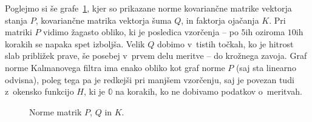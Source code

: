 \documentclass[a4paper,pdftex,10pt]{article}
\numberwithin{figure}{section} %
\begin{document}
Poglejmo si še grafe~\ref{slika11}, kjer so prikazane norme kovariančne matrike vektorja 
stanja $P$, kovariančne matrika vektorja šuma $Q$, in faktorja ojačanja $K$. Pri matriki
$P$ vidimo žagasto obliko, ki je posledica vzorčenja -- po $5$ih oziroma $10$ih korakih
se napaka spet izboljša. Velik $Q$ dobimo v~tistih točkah, ko je hitrost slab približek
prave, še posebej v~prvem delu meritve -- do krožnega zavoja. Graf norme Kalmanovega filtra
ima enako obliko kot graf norme $P$ (saj sta linearno odvisna), poleg tega pa je redkejši 
pri manjšem vzorčenju, saj je povezan tudi z~okensko funkcijo $H$, ki je $\mathbb{0}$ na
korakih, ko ne dobivamo podatkov o~meritvah.
\begin{figure}[H]
    \centering
    \resizebox{.49\linewidth}{!}{}
    \resizebox{.49\linewidth}{!}{}
    \resizebox{.49\linewidth}{!}{}
    \caption{Norme matrik $P$, $Q$ in $K$.}
    \label{slika11}
\end{figure}

\end{document}
